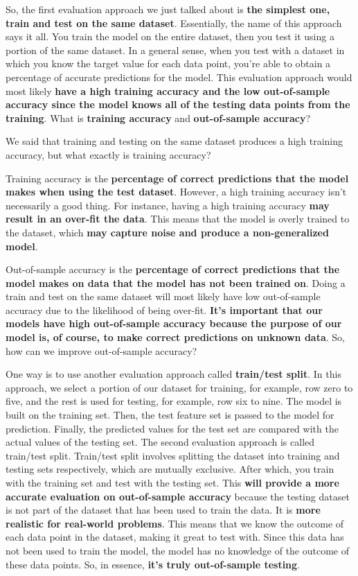     So, the first evaluation approach we just talked about is \textbf{the simplest one, train and test on the same dataset}. Essentially, the name of this approach says it all. You train the model on the entire dataset, then you test it using a portion of the same dataset. In a general sense, when you test with a dataset in which you know the target value for each data point, you're able to obtain a percentage of accurate predictions for the model. 
    This evaluation approach would most likely \textbf{have a high training accuracy and the low out-of-sample accuracy since the model knows all of the testing data points from the training}. What is \textbf{training accuracy} and \textbf{out-of-sample accuracy}? 
    
    We said that training and testing on the same dataset produces a high training accuracy, but what exactly is training accuracy?
    
    Training accuracy is the \textbf{percentage of correct predictions that the model makes when using the test dataset}. However, a high training accuracy isn't necessarily a good thing. For instance, having a high training accuracy \textbf{may result in an over-fit the data}. 
    This means that the model is overly trained to the dataset, which \textbf{may capture noise and produce a non-generalized model}. 
    
    Out-of-sample accuracy is the \textbf{percentage of correct predictions that the model makes on data that the model has not been trained on}. Doing a train and test on the same dataset will most likely have low out-of-sample accuracy due to the likelihood of being over-fit. \textbf{It's important that our models have high out-of-sample accuracy because the purpose of our model is, of course, to make correct predictions on unknown data}. So, how can we improve out-of-sample accuracy? 
    
    One way is to use another evaluation approach called \textbf{train/test split}. In this approach, we select a portion of our dataset for training, for example, row zero to five, and the rest is used for testing, for example, row six to nine. The model is built on the training set. Then, the test feature set is passed to the model for prediction. Finally, the predicted values for the test set are compared with the actual values of the testing set. 
    The second evaluation approach is called train/test split. Train/test split involves splitting the dataset into training and testing sets respectively, which are mutually exclusive. After which, you train with the training set and test with the testing set. This\textbf{ will provide a more accurate evaluation on out-of-sample accuracy} because the testing dataset is not part of the dataset that has been used to train the data. It is \textbf{more realistic for real-world problems}. This means that we know the outcome of each data point in the dataset, making it great to test with. 
    Since this data has not been used to train the model, the model has no knowledge of the outcome of these data points. So, in essence, \textbf{it's truly out-of-sample testing}. 
    
